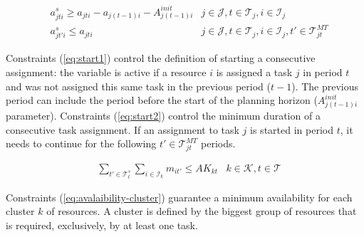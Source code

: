 \documentclass[a4paper,onecolumn,fleqn]{article}
\begin{document}
    \begin{align}
        & a^s_{jti} \geq a_{jti} - a_{j(t-1)i} - A^{init}_{j(t-1)i}
                & j \in \mathcal{J}, t \in \mathcal{T}_j, i \in \mathcal{I}_j \label{eq:start1} \\
        & a^s_{jt'i} \leq a_{jti}
        & j \in \mathcal{J}, t \in \mathcal{T}_j, i \in \mathcal{I}_j, t' \in \mathcal{T}^{MT}_{jt} \label{eq:start2}
    \end{align}

    Constraints (\ref{eq:start1}) control the definition of starting a consecutive assignment: the variable is active if a resource $i$ is assigned a task $j$ in period $t$ and was not assigned this same task in the previous period ($t-1$). The previous period can include the period before the start of the planning horizon ($A^{init}_{j(t-1)i}$ parameter).
    Constraints (\ref{eq:start2}) control the minimum duration of a consecutive task assignment. If an assignment to task $j$ is started in period $t$, it needs to continue for the following $t' \in \mathcal{T}^{MT}_{jt}$ periods.

    \begin{align}
       & \sum_{t' \in \mathcal{T}^{s}_t} \sum_{i \in \mathcal{I}_k} m_{it'} \leq AK_{kt}
        &k \in \mathcal{K}, t \in \mathcal{T} \label{eq:avalaibility-cluster}
    \end{align}

    Constraints (\ref{eq:avalaibility-cluster}) guarantee a minimum availability for each cluster $k$ of resources. A cluster is defined by the biggest group of resources that is required, exclusively, by at least one task.
\end{document}
